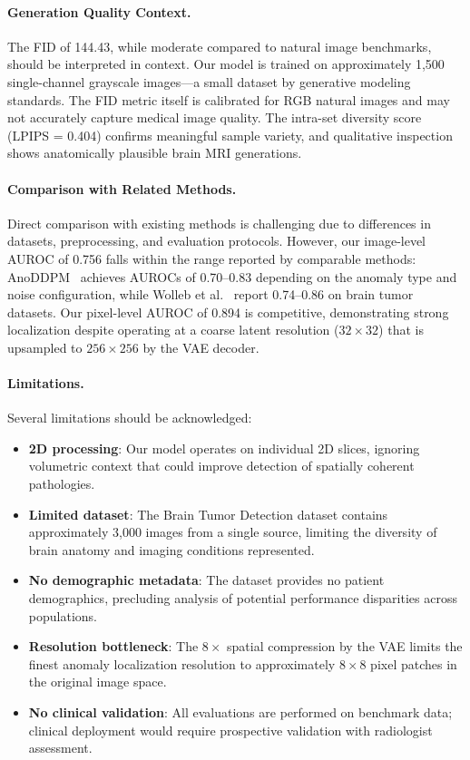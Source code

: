 \paragraph{Generation Quality Context.} The FID of 144.43, while moderate compared to natural image benchmarks, should be interpreted in context. Our model is trained on approximately 1,500 single-channel grayscale images---a small dataset by generative modeling standards. The FID metric itself is calibrated for RGB natural images and may not accurately capture medical image quality. The intra-set diversity score (LPIPS = 0.404) confirms meaningful sample variety, and qualitative inspection shows anatomically plausible brain MRI generations.

\paragraph{Comparison with Related Methods.} Direct comparison with existing methods is challenging due to differences in datasets, preprocessing, and evaluation protocols. However, our image-level AUROC of 0.756 falls within the range reported by comparable methods: AnoDDPM~\cite{wyatt2022anoddpm} achieves AUROCs of 0.70--0.83 depending on the anomaly type and noise configuration, while Wolleb et al.~\cite{wolleb2022diffusion} report 0.74--0.86 on brain tumor datasets. Our pixel-level AUROC of 0.894 is competitive, demonstrating strong localization despite operating at a coarse latent resolution ($32 \times 32$) that is upsampled to $256 \times 256$ by the VAE decoder.

\paragraph{Limitations.} Several limitations should be acknowledged:
\begin{itemize}[leftmargin=*]
  \item \textbf{2D processing}: Our model operates on individual 2D slices, ignoring volumetric context that could improve detection of spatially coherent pathologies.
  \item \textbf{Limited dataset}: The Brain Tumor Detection dataset contains approximately 3,000 images from a single source, limiting the diversity of brain anatomy and imaging conditions represented.
  \item \textbf{No demographic metadata}: The dataset provides no patient demographics, precluding analysis of potential performance disparities across populations.
  \item \textbf{Resolution bottleneck}: The $8\times$ spatial compression by the VAE limits the finest anomaly localization resolution to approximately $8 \times 8$ pixel patches in the original image space.
  \item \textbf{No clinical validation}: All evaluations are performed on benchmark data; clinical deployment would require prospective validation with radiologist assessment.
\end{itemize}

